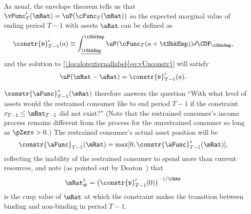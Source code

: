 \documentclass[\econtexRoot/BufferStockTheory]{subfiles}
\begin{document}
As usual, the envelope theorem tells us that
$\vFunc_{T}^{\prime}(\mRat)=\uP(\cFunc_{T}(\mRat))$ so the expected marginal
value of ending period $T-1$ with assets $\aRat$ can be defined as
\begin{equation}\begin{gathered}\begin{aligned}
  \constr{\mathfrak{v}}_{T-1}^{\prime}(a)  & \equiv  \int_{\underline{\tShkEmp}}^{\bar{\tShkEmp}} \uP(\cFunc_{T}(a+\tShkEmp)) d\CDF_{\tShkEmp}, \notag
\end{aligned}\end{gathered}\end{equation}
and the solution to \eqref{\localorexternallabel{eq:vUnconstr}} will satisfy
\begin{equation}\begin{gathered}\begin{aligned}
  \uP(\mRat-\aRat)  & =  \constr{\mathfrak{v}}_{T-1}^{\prime}(a) \label{eq:uPConstr}.
%
\end{aligned}\end{gathered}\end{equation}

$\constr{\aFunc}_{T-1}^{*}(\mRat)$ therefore answers the question ``With what
level of assets would the restrained consumer like to end period $T-1$
if the constraint $c_{T-1} \leq \mRat_{T-1}$ did not exist?''  (Note that
the restrained consumer's income process remains different from the
process for the unrestrained consumer so long as $\pZero>0$.)  The
restrained consumer's actual asset position will be
 \begin{equation}\begin{gathered}\begin{aligned}
  \constr{\aFunc}_{T-1}(\mRat)  & = \max[0,\constr{\aFunc}^{*}_{T-1}(\mRat)], \notag
\end{aligned}\end{gathered}\end{equation}
reflecting the inability of the restrained consumer to spend more than
current resources, and note (as pointed out by
Deaton~\citeyearpar{deatonLiqConstr}) that
 \begin{equation}\begin{gathered}\begin{aligned}
  \mRat^{1}_{\#}  & = \left( \constr{\mathfrak{v}}_{T-1}^{\prime}(0)\right)^{-1/\CRRA} \notag
 \end{aligned}\end{gathered}\end{equation}
is the cusp value of $\mRat$ at which the constraint makes the
transition between binding and non-binding in period $T-1$.
\end{document}

